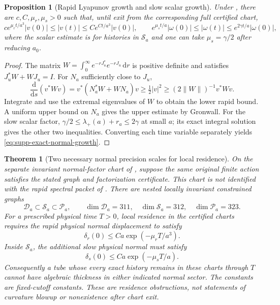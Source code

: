\documentclass[11pt]{article}
\newtheorem{theorem}{Theorem}[section]
\numberwithin{equation}{section}
\newtheorem{proposition}[proposition]{Proposition}
\theoremstyle{definition}
\theoremstyle{remark}
\newcommand{\dd}{\mathrm d}
\begin{document}
\begin{proposition}[Rapid Lyapunov growth and slow scalar growth]
\label{prop:supp-exact-normal-growth}
Under , there are $c,C,\mu_r,\mu_s>0$
such that, until exit from the corresponding full certified chart,
\begin{equation}
 c e^{\mu_rt/a^3}|v(0)|\le |v(t)|\le C e^{Ct/a^3}|v(0)|,
 \qquad
 e^{\mu_st/a}|\omega(0)|\le |\omega(t)|\le e^{2\gamma t/a}|\omega(0)|,
 \label{eq:supp-exact-normal-growth}
\end{equation}
where the scalar estimate is for histories in $\mathcal S_a$ and one can
take $\mu_s=\gamma/2$ after reducing $a_0$.
\end{proposition}
\begin{proof}
The matrix
$W=\int_0^\infty e^{-rJ_u^*}e^{-rJ_u}\,\dd r$ is positive definite and
satisfies $J_u^*W+WJ_u=I$. For $N_a$ sufficiently close to $J_u$,
\[
 \frac{\dd}{\dd s}(v^*Wv)
       =v^*(N_a^*W+WN_a)v\ge\tfrac12|v|^2
       \ge (2\|W\|)^{-1}v^*Wv.
\]
Integrate and use the extremal eigenvalues of $W$ to obtain the lower
rapid bound. A uniform upper bound on $N_a$ gives the upper estimate by
Gronwall. For the slow scalar factor,
$\gamma/2\le\lambda_+(a)+r_a\le2\gamma$ at small $a$; its exact integral
solution gives the other two inequalities. Converting each time variable
separately yields \eqref{eq:supp-exact-normal-growth}.
\end{proof}

\begin{theorem}[Two necessary normal precision scales for local residence]
\label{thm:main-exact-residence}
On the separate invariant normal-factor chart of , suppose the same original finite action satisfies the stated graph and factorization certificate.  This chart is not identified with the rapid spectral packet of .  There are nested
locally invariant constrained graphs
\[
 \mathcal D_a\subset\mathcal S_a\subset\mathcal P_a,
 \qquad \dim\mathcal D_a=311,\quad
 \dim\mathcal S_a=312,\quad\dim\mathcal P_a=323.
\]
For a prescribed physical time $T>0$, local residence in the certified
charts requires the rapid physical normal displacement to satisfy
\begin{equation}
 \delta_r(0)\le Ca\exp(-\mu_rT/a^3).
 \label{eq:main-exact-rapid-width}
\end{equation}
Inside $\mathcal S_a$, the additional slow physical normal must satisfy
\begin{equation}
 \delta_s(0)\le Ca\exp(-\mu_sT/a).
 \label{eq:main-exact-slow-width}
\end{equation}
Consequently a tube whose every exact history remains in these charts
through $T$ cannot have algebraic thickness in either indicated normal
sector. The constants are fixed-cutoff constants. These are residence
obstructions, not statements of curvature blowup or nonexistence after
chart exit.
\end{theorem}
\end{document}
